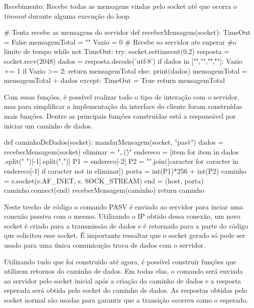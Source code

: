 \documentclass[11pt]{IEEEtran}
\begin{document}
Recebimento: Recebe todas as mensagens vindas pelo socket até que ocorra o \textit{timeout} durante alguma execução do loop.
\begin{python}
# Tenta recebe as mensagens do servidor
def receberMensagem(socket):
  TimeOut = False
  mensagemTotal = ""
  Vazio = 0
  # Recebe so servidor ate superar 
  #o limite de tempo
  while not TimeOut:
    try:
     socket.settimeout(0.2)
     resposta = socket.recv(2048)
     dados = resposta.decode('utf-8')
     if dados in ["","\n","\r","\r\n"]:
        Vazio += 1
        if Vazio >= 2:
          return mensagemTotal
     else:
       print(dados)
       mensagemTotal = mensagemTotal 
                            + dados
    except:
      TimeOut = True
  return mensagemTotal
\end{python}

Com essas funções, é possível realizar todo o tipo de interação com o servidor, mas para simplificar a implementação da interface do cliente foram construídas mais funções. Dentre as principais funções construídas está a responsável por iniciar um caminho de dados.
\begin{python} 
def caminhoDeDados(socket):
 mandarMensagem(socket, "pasv\r\n")
 dados = receberMensagem(socket)
 eliminar = ",.()\r\n"
 endereco = [item for item in dados
            .split(" ")[-1].split(",")]
 P1 = endereco[-2]
 P2 = "".join([caracter for caracter in 
    endereco[-1] if caracter not in 
                            eliminar])
 porta = int(P1)*256 + int(P2)
 caminho = s.socket(s.AF_INET, s.
                        SOCK_STREAM)
 end = (host, porta)
 caminho.connect(end)
 receberMensagem(caminho)
 return caminho
\end{python}

Neste trecho de código o comando PASV é enviado ao servidor para inciar uma conexão passiva com o mesmo. Utilizando o IP obtido dessa conexão, um novo socket é criado para a transmissão de dados e é retornado para a parte do código que solicitou esse socket. É importante ressaltar que o socket gerado só pode ser usado para uma única comunicação troca de dados com o servidor.

Utilizando tudo que foi construído até agora, é possível construir funções que utilizem retornos do caminho de dados. Em todas elas, o comando será enviada ao servidor pelo socket inicial após a criação do caminho de dados e a resposta esperada será obtida pelo socket do caminho de dados. As respostas obtidas pelo socket normal são usadas para garantir que a transição ocorreu como o esperado.
\end{document}
